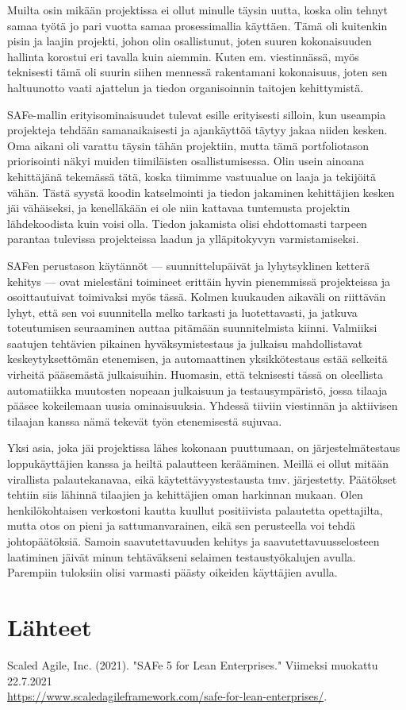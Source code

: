 \documentclass{article}
\begin{document}
Muilta osin mikään projektissa ei ollut minulle täysin uutta, koska olin tehnyt
samaa työtä jo pari vuotta samaa prosessimallia käyttäen. Tämä oli kuitenkin
pisin ja laajin projekti, johon olin osallistunut, joten suuren kokonaisuuden
hallinta korostui eri tavalla kuin aiemmin. Kuten em. vies\-tinnässä, myös
teknisesti tämä oli suurin siihen mennessä rakentamani kokonaisuus, joten sen
hal\-tuun\-otto vaati ajattelun ja tiedon organisoinnin taitojen kehittymistä.

SAFe-mallin erityisominaisuudet tulevat esille erityisesti silloin, kun
useampia projekteja tehdään samanaikai\-sesti ja ajankäyttöä täytyy jakaa
niiden kesken. Oma aikani oli varattu täysin tähän projektiin, mutta tämä
portfoliotason priorisointi näkyi muiden tiimiläisten osallistumisessa. Olin
usein ainoana kehittäjänä tekemässä tätä, koska tiimimme vastuualue on laaja ja
tekijöitä vähän. Tästä syystä koodin katselmointi ja tiedon jakaminen
kehittäjien kesken jäi vähäiseksi, ja kenelläkään ei ole niin kattavaa
tuntemusta projektin lähdekoodista kuin voisi olla. Tiedon jakamista olisi
ehdottomasti tarpeen parantaa tulevissa projekteissa laadun ja ylläpitokyvyn
varmistamiseksi.

SAFen perustason käytännöt — suunnittelupäivät ja lyhytsyklinen ketterä kehitys
— ovat mielestäni toimineet erittäin hyvin pienemmissä projekteissa ja
osoittautuivat toimivaksi myös tässä. Kolmen kuukauden aikaväli on riittävän
lyhyt, että sen voi suunnitella melko tarkasti ja luotettavasti, ja jatkuva
toteutumisen seuraaminen auttaa pitämään suunnitelmista kiinni. Valmiik\-si
saatujen tehtävien pikainen hyväksymistestaus ja julkaisu mahdollistavat
keskeytyksettömän etenemisen, ja automaattinen yksikkötestaus estää selkeitä
virheitä pääsemästä julkaisuihin. Huomasin, että teknisesti tässä on oleellista
automatiikka muutosten nopeaan julkai\-suun ja testausympäristö, jossa tilaaja
pääsee kokeilemaan uusia ominaisuuksia. Yhdessä tiiviin viestinnän ja
aktiivisen tilaajan kanssa nämä tekevät työn etenemisestä sujuvaa.

Yksi asia, joka jäi projektissa lähes kokonaan puuttumaan, on järjestelmätestaus
loppukäyttäjien kanssa ja heiltä palautteen kerääminen. Meillä ei ollut mitään
virallista palautekanavaa, eikä käy\-tettävyystestausta tmv. järjestetty. Päätökset
tehtiin siis lähinnä tilaajien ja kehittäjien oman harkinnan mukaan. Olen
henkilökohtaisen verkostoni kautta kuullut positiivista palautetta opettajilta,
mutta otos on pieni ja sattumanvarainen, eikä sen perusteella voi tehdä
johtopäätöksiä. Samoin saavutettavuuden kehitys ja saavutettavuusselosteen
laatiminen jäivät minun tehtäväkseni selai\-men testaustyökalujen avulla.
Parempiin tuloksiin olisi varmasti päästy oikeiden käyttäjien avulla.

\section{Lähteet}

Scaled Agile, Inc. (2021). "SAFe 5 for Lean Enterprises." Viimeksi muokattu 22.7.2021
\\ \url{https://www.scaledagileframework.com/safe-for-lean-enterprises/}.
\end{document}
